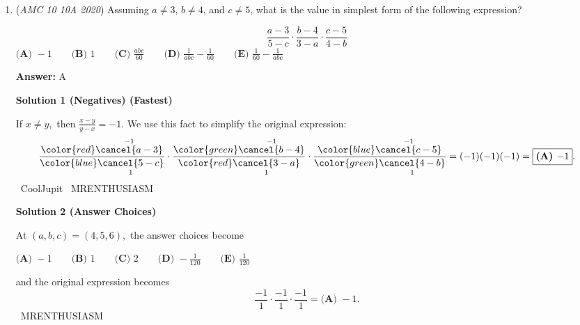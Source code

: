 \begin{enumerate}
 Incidentally we can immediately rule out answers A and B as being too small - with these we'd never catch up to get our average of 15. An alternative solution is that to get an average of 15 we need a sum of 15*5 = 75. We have 3, 5, and 7 which adds up to 15, so a and b must make up the remaining 75-15 = 60. 60/2 = 30 so the average of a and b is 30.

 \begin{verbatim}
	~Dilip
\end{verbatim}




 


 Education, The Study of Everything

 


	\item (\textit{AMC 10 10A 2020}) Assuming $a\neq3$, $b\neq4$, and $c\neq5$, what is the value in simplest form of the following expression?

 \[\frac{a-3}{5-c} \cdot \frac{b-4}{3-a} \cdot \frac{c-5}{4-b}\]
$\textbf{(A) } {-}1 \qquad \textbf{(B) } 1 \qquad \textbf{(C) } \frac{abc}{60} \qquad \textbf{(D) } \frac{1}{abc} - \frac{1}{60} \qquad \textbf{(E) } \frac{1}{60} - \frac{1}{abc}$

 \textbf{Answer: }A



\textbf{Solution 1 (Negatives) (Fastest)}

If $x\neq y,$ then $\frac{x-y}{y-x}=-1.$ We use this fact to simplify the original expression:
 \[\frac{\color{red}\overset{-1}{\cancel{a-3}}}{\color{blue}\underset{1}{\cancel{5-c}}} \cdot \frac{\color{green}\overset{-1}{\cancel{b-4}}}{\color{red}\underset{1}{\cancel{3-a}}} \cdot \frac{\color{blue}\overset{-1}{\cancel{c-5}}}{\color{green}\underset{1}{\cancel{4-b}}}=(-1)(-1)(-1)=\boxed{\textbf{(A) } {-}1}.\]~CoolJupit ~MRENTHUSIASM

 



\textbf{Solution 2 (Answer Choices)}

At $(a,b,c)=(4,5,6),$ the answer choices become

 $\textbf{(A) } {-}1 \qquad \textbf{(B) } 1 \qquad \textbf{(C) } 2 \qquad \textbf{(D) } {-}\frac{1}{120} \qquad \textbf{(E) } \frac{1}{120}$

 and the original expression becomes 
 \[\frac{-1}{1}\cdot\frac{-1}{1}\cdot\frac{-1}{1}=\boxed{\textbf{(A) } {-}1}.\]~MRENTHUSIASM

 




\end{enumerate}
